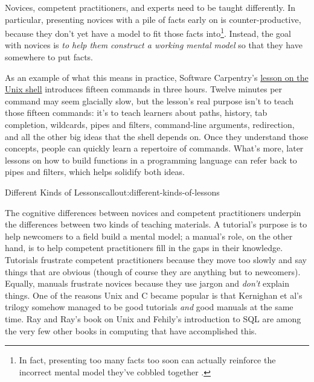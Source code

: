 Novices, competent practitioners, and experts need to be taught
differently.  In particular, presenting novices with a pile of facts
early on is counter-productive, because they don't yet have a model to
fit those facts into\footnote{In fact, presenting too many facts too
soon can actually reinforce the incorrect mental model they've cobbled
together \cite{fixme}.}. Instead, the goal with novices is \emph{to
help them construct a working mental model} so that they have
somewhere to put facts.

As an example of what this means in practice, Software Carpentry's
\href{http://swcarpentry.github.io/shell-novice/}{lesson on the Unix
shell} introduces fifteen commands in three hours. Twelve minutes per
command may seem glacially slow, but the lesson's real purpose isn't
to teach those fifteen commands: it's to teach learners about paths,
history, tab completion, wildcards, pipes and filters, command-line
arguments, redirection, and all the other big ideas that the shell
depends on.  Once they understand those concepts, people can quickly
learn a repertoire of commands.  What's more, later lessons on how to
build functions in a programming language can refer back to pipes and
filters, which helps solidify both ideas.

\begin{callout}{Different Kinds of Lessons}{callout:different-kinds-of-lessons}

The cognitive differences between novices and competent practitioners
underpin the differences between two kinds of teaching materials. A
tutorial's purpose is to help newcomers to a field build a mental model;
a manual's role, on the other hand, is to help competent practitioners
fill in the gaps in their knowledge. Tutorials frustrate competent
practitioners because they move too slowly and say things that are
obvious (though of course they are anything but to newcomers). Equally,
manuals frustrate novices because they use jargon and \emph{don't}
explain things. One of the reasons Unix and C became popular is that
Kernighan et al's trilogy \cite{bib:kernighan-plauger-elements,bib:kernighan-pike-upe,bib:kernighan-ritchie-c}
somehow managed to be good tutorials
\emph{and} good manuals at the same time. Ray and Ray's book on Unix
\cite{bib:ray-ray-unix}
and Fehily's introduction to SQL \cite{bib:fehily-sql} are among the
very few other books in computing that have accomplished this.

\end{callout}

